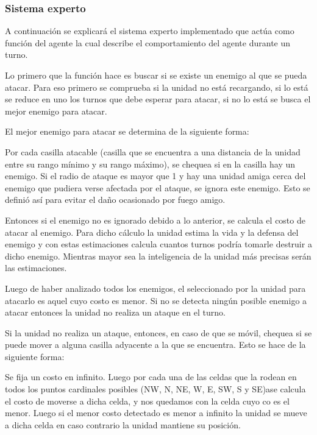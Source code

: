 \subsubsection{Sistema experto}

A continuaci\'on se explicar\'a el sistema experto implementado que act\'ua como funci\'on del agente la cual describe el comportamiento del agente durante un turno.


Lo primero que la funci\'on hace es buscar si se existe un enemigo al que se pueda atacar. Para eso primero se comprueba si la unidad no est\'a recargando, si lo est\'a se reduce en uno los turnos que debe esperar para atacar, si no lo est\'a se busca el mejor enemigo para atacar. 
 
El mejor enemigo para atacar se determina de la siguiente forma:
 
Por cada casilla atacable (casilla que se encuentra a una distancia de la unidad entre su rango m\'inimo y su rango m\'aximo), se chequea si en la casilla hay un enemigo. Si el radio de ataque es mayor que 1 y hay una unidad amiga cerca del enemigo que pudiera verse afectada por el ataque, se ignora este enemigo. Esto se defini\'o as\'i para evitar el da\~{n}o ocasionado por fuego amigo.
 
Entonces si el enemigo no es ignorado debido a lo anterior, se calcula el costo de atacar al enemigo. Para dicho c\'alculo la unidad estima la vida y la defensa del enemigo y con estas estimaciones calcula cuantos turnos podr\'ia tomarle destruir a dicho enemigo. Mientras mayor sea la inteligencia de la unidad m\'as precisas ser\'an las estimaciones.

Luego de haber analizado todos los enemigos, el seleccionado por la unidad para atacarlo es aquel cuyo costo es menor. Si no se detecta ning\'un posible enemigo a atacar entonces la unidad no realiza un ataque en el turno.
 
Si la unidad no realiza un ataque, entonces, en caso de que se m\'ovil, chequea si se puede mover a alguna casilla adyacente a la que se encuentra. Esto se hace de la siguiente forma:
 
Se fija un costo en infinito. Luego por cada una de las celdas que la rodean en todos los puntos cardinales posibles (NW, N, NE, W, E, SW, S y SE)ase calcula el costo de moverse a dicha celda, y nos quedamos con la celda cuyo co es el menor. Luego si el menor costo detectado es menor a infinito la unidad se mueve a dicha celda en caso contrario la unidad mantiene su posici\'on. 
 
